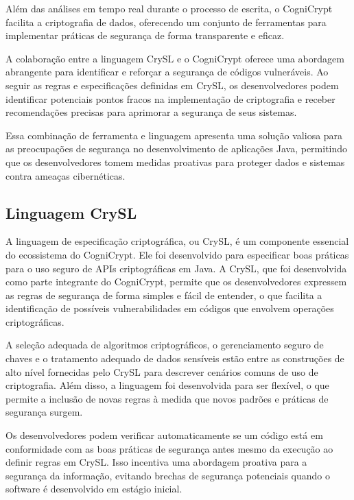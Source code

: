 Além das análises em tempo real durante o processo de escrita, o CogniCrypt facilita a criptografia de dados, oferecendo um conjunto de ferramentas para implementar práticas de segurança de forma transparente e eficaz.

A colaboração entre a linguagem CrySL e o CogniCrypt oferece uma abordagem abrangente para identificar e reforçar a segurança de códigos vulneráveis. Ao seguir as regras e especificações definidas em CrySL, os desenvolvedores podem identificar potenciais pontos fracos na implementação de criptografia e receber recomendações precisas para aprimorar a segurança de seus sistemas.

Essa combinação de ferramenta e linguagem apresenta uma solução valiosa para as preocupações de segurança no desenvolvimento de aplicações Java, permitindo que os desenvolvedores tomem medidas proativas para proteger dados e sistemas contra ameaças cibernéticas.

\subsection{Linguagem CrySL} %

A linguagem de especificação criptográfica, ou CrySL, é um componente essencial do ecossistema do CogniCrypt. Ele foi desenvolvido para especificar boas práticas para o uso seguro de APIs criptográficas em Java. A CrySL, que foi desenvolvida como parte integrante do CogniCrypt, permite que os desenvolvedores expressem as regras de segurança de forma simples e fácil de entender, o que facilita a identificação de possíveis vulnerabilidades em códigos que envolvem operações criptográficas.

A seleção adequada de algoritmos criptográficos, o gerenciamento seguro de chaves e o tratamento adequado de dados sensíveis estão entre as construções de alto nível fornecidas pelo CrySL para descrever cenários comuns de uso de criptografia. Além disso, a linguagem foi desenvolvida para ser flexível, o que permite a inclusão de novas regras à medida que novos padrões e práticas de segurança surgem.

Os desenvolvedores podem verificar automaticamente se um código está em conformidade com as boas práticas de segurança antes mesmo da execução ao definir regras em CrySL. Isso incentiva uma abordagem proativa para a segurança da informação, evitando brechas de segurança potenciais quando o software é desenvolvido em estágio inicial.

